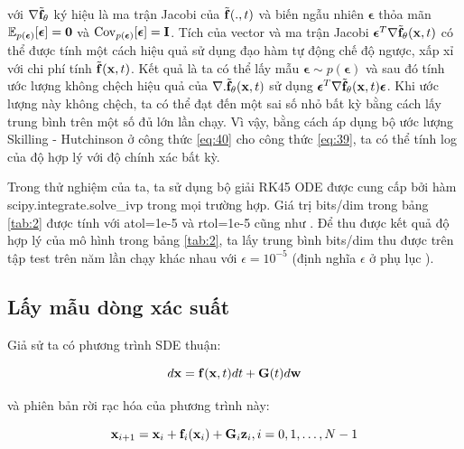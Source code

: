 \documentclass{article} %
\begin{document}
với $\nabla \tilde{\bold{f}}_{\bold{\theta}}$ ký hiệu là ma trận Jacobi của $\tilde{\bold{f}}(., t)$ và biến ngẫu nhiên $\boldsymbol{\epsilon}$ thỏa mãn $\mathbb{E}_{p(\boldsymbol{\epsilon})} \lbrack \boldsymbol{\epsilon} \rbrack = \bold{0}$ và $\mathrm{Cov}_{p(\boldsymbol{\epsilon})} \lbrack \boldsymbol{\epsilon} \rbrack = \bold{I}$.
Tích của vector và ma trận Jacobi $\boldsymbol{\epsilon}^T \nabla \tilde{\bold{f}}_{\bold{\theta}}(\bold{x}, t)$ có thể được tính một cách hiệu quả sử dụng đạo hàm tự động chế độ ngược, xấp xỉ với chi phí tính $\tilde{\bold{f}}(\bold{x}, t)$.
Kết quả là ta có thể lấy mẫu $\boldsymbol{\epsilon} \sim p(\boldsymbol{\epsilon})$ và sau đó tính ước lượng không chệch hiệu quả của $\nabla . \tilde{\bold{f}}_{\bold{\theta}}(\bold{x}, t)$ sử dụng $\boldsymbol{\epsilon}^T \nabla \tilde{\bold{f}}_{\bold{\theta}} (\bold{x}, t) \boldsymbol{\epsilon}$.
Khi ước lượng này không chệch, ta có thể đạt đến một sai số nhỏ bất kỳ bằng cách lấy trung bình trên một số đủ lớn lần chạy.
Vì vậy, bằng cách áp dụng bộ ước lượng Skilling - Hutchinson ở công thức \ref{eq:40} cho công thức \ref{eq:39}, ta có thể tính log của độ hợp lý với độ chính xác bất kỳ.

Trong thử nghiệm của ta, ta sử dụng bộ giải RK45 ODE \citep{dormand1980family} được cung cấp bởi hàm scipy.integrate.solve\_ivp trong mọi trường hợp.
Giá trị bits/dim trong bảng \ref{tab:2} được tính với atol=1e-5 và rtol=1e-5 cũng như \citep{grathwohl2018ffjord}.
Để thu được kết quả độ hợp lý của mô hình trong bảng \ref{tab:2}, ta lấy trung bình bits/dim thu được trên tập test trên năm lần chạy khác nhau với $\epsilon=10^{-5}$ (định nghĩa $\epsilon$ ở phụ lục ).

\subsection{Lấy mẫu dòng xác suất} \label{D.3}

Giả sử ta có phương trình SDE thuận:

\begin{equation*}
    d \bold{x} = \bold{f}(\bold{x}, t) d t + \bold{G}(t) d \bold{w}
\end{equation*}

và phiên bản rời rạc hóa của phương trình này:

\begin{equation} \label{eq:41}
    \bold{x}_{i+1} = \bold{x}_i + \bold{f}_i(\bold{x}_i) + \bold{G}_i \bold{z}_i, i = 0, 1, \dots, N - 1
\end{equation}
\end{document}
